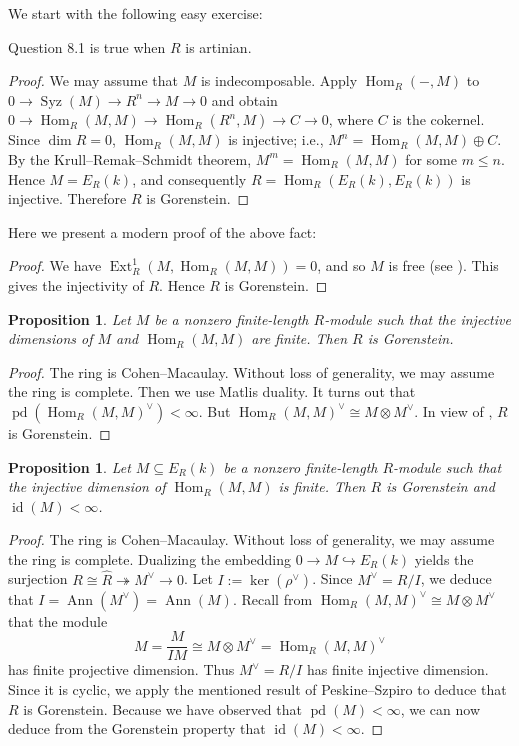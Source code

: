 \documentclass[10. pt,a4paper]{amsart}
\newtheorem{proposition}[theorem]{Proposition}
\theoremstyle{definition}
\theoremstyle{remark}
\newcommand{\Syz}{\operatorname{Syz}}
\newcommand{\id}{\operatorname{id}}
\newcommand{\pd}{\operatorname{pd}}
\newcommand{\Ext}{\operatorname{Ext}}
\newcommand{\Hom}{\operatorname{Hom}}
\newcommand{\Ann}{\operatorname{Ann}}
\begin{document}
We start with the following easy exercise:

\begin{fact}
	Question 8.1 is true when $R$ is artinian.
\end{fact}

\begin{proof}
	We may assume that $M$ is indecomposable. Apply $\Hom_R(-, M)$ to $0 \to \Syz(M) \to R^n \to M \to 0$ and obtain $0 \to \Hom_R(M, M) \to \Hom_R(R^n, M) \to C \to 0$, where $C$ is the cokernel. Since $\dim R = 0$, $\Hom_R(M, M)$ is injective; i.e., $M^n = \Hom_R(M, M) \oplus C$. By the Krull--Remak--Schmidt theorem, $M^m = \Hom_R(M, M)$ for some $m \leq n$. Hence $M = E_R(k)$, and consequently $R = \Hom_R(E_R(k), E_R(k))$ is injective. Therefore $R$ is Gorenstein.
\end{proof}

Here we present a modern proof of the above fact:

\begin{proof}
	We have $\Ext^1_R(M, \Hom_R(M, M)) = 0$, and so $M$ is free (see \cite{ta}). This gives the injectivity of $R$. Hence $R$ is Gorenstein.
\end{proof}

\begin{proposition}
	Let $M$ be a nonzero finite-length $R$-module such that the injective dimensions of $M$ and $\Hom_R(M, M)$ are finite. Then $R$ is Gorenstein.
\end{proposition}

\begin{proof}
	The ring is Cohen--Macaulay. Without loss of generality, we may assume the ring is complete. Then we use Matlis duality. It turns out that $\pd(\Hom_R(M, M)^\vee) < \infty$. But $\Hom_R(M, M)^\vee \cong M \otimes M^\vee$. In view of \cite[A.9(ii)]{celp}, $R$ is Gorenstein.
\end{proof}

\begin{proposition}
	Let $M \subseteq E_R(k)$ be a nonzero finite-length $R$-module such that the injective dimension of $\Hom_R(M, M)$ is finite. Then $R$ is Gorenstein and $\id(M) < \infty$.
\end{proposition}

\begin{proof}
	The ring is Cohen--Macaulay. Without loss of generality, we may assume the ring is complete. Dualizing the embedding $0 \to M \hookrightarrow E_R(k)$ yields the surjection $R \cong \widehat{R} \twoheadrightarrow M^\vee \to 0$. Let $I := \ker(\rho^\vee)$. Since $M^\vee = R/I$, we deduce that $I = \Ann(M^\vee) = \Ann(M)$. Recall from $\Hom_R(M, M)^\vee \cong M \otimes M^\vee$ that the module
	\[
	M = \frac{M}{IM} \cong M \otimes M^\vee = \Hom_R(M, M)^\vee
	\]
	has finite projective dimension. Thus $M^\vee = R/I$ has finite injective dimension. Since it is cyclic, we apply the mentioned result of Peskine--Szpiro to deduce that $R$ is Gorenstein. Because we have observed that $\pd(M) < \infty$, we can now deduce from the Gorenstein property that $\id(M) < \infty$.
\end{proof}
\end{document}
